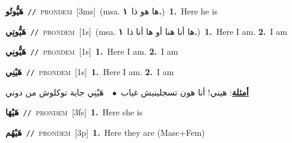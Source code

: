 \documentclass[10pt,a4paper,twoside]{article} %
\begin{document}
\begin{multicols}{2}
{\setlength\topsep{0pt}\textbf{\foreignlanguage{arabic}{هَيُّوتُو}}\ {\color{gray}\texttt{//}\color{black}}\ \textsc{pron\textunderscore dem}\ [3ms]\ \color{gray}(msa. \foreignlanguage{arabic}{ها هو ذا}~\foreignlanguage{arabic}{\textbf{١.}})\color{black}\ \textbf{1.}~Here he is\ } \vspace{2mm}

{\setlength\topsep{0pt}\textbf{\foreignlanguage{arabic}{هَيُّوتِي}}\ {\color{gray}\texttt{//}\color{black}}\ \textsc{pron\textunderscore dem}\ [1s]\ \color{gray}(msa. \foreignlanguage{arabic}{ها أنا هنا أو ها أنا ذا}~\foreignlanguage{arabic}{\textbf{١.}})\color{black}\ \textbf{1.}~Here I am.  \textbf{2.}~I am\ } \vspace{2mm}

{\setlength\topsep{0pt}\textbf{\foreignlanguage{arabic}{هَيُّونِي}}\ {\color{gray}\texttt{//}\color{black}}\ \textsc{pron\textunderscore dem}\ [1s]\ \textbf{1.}~Here I am.  \textbf{2.}~I am\ } \vspace{2mm}

{\setlength\topsep{0pt}\textbf{\foreignlanguage{arabic}{هَيْنِي}}\ {\color{gray}\texttt{//}\color{black}}\ \textsc{pron\textunderscore dem}\ [1s]\ \textbf{1.}~Here I am.  \textbf{2.}~I am\  \begin{flushright}\color{gray}\foreignlanguage{arabic}{\textbf{\underline{\foreignlanguage{arabic}{أمثلة}}}: هيني! أنا هون تسجلينيش غياب\ $\bullet$\ \  هَيْنِي جاية توكلوش من دوني}\end{flushright}\color{black}} \vspace{2mm}

{\setlength\topsep{0pt}\textbf{\foreignlanguage{arabic}{هَيْهَا}}\ {\color{gray}\texttt{//}\color{black}}\ \textsc{pron\textunderscore dem}\ [3fs]\ \textbf{1.}~Here she is\ } \vspace{2mm}

{\setlength\topsep{0pt}\textbf{\foreignlanguage{arabic}{هَيْهُم}}\ {\color{gray}\texttt{//}\color{black}}\ \textsc{pron\textunderscore dem}\ [3p]\ \textbf{1.}~Here they are (Masc+Fem)\ } \vspace{2mm}

\end{multicols}
\end{document}
